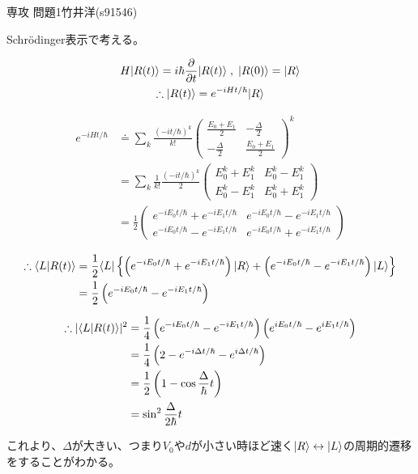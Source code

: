 \documentclass[fleqn]{jbook}
\begin{document}
\begin{answer}{専攻 問題1}{竹井洋(s91546)}
\begin{subanswers}
\SubSubAnswer
Schr\"{o}dinger表示で考える。

\begin{gather*}
H\Ket{R(t)}=i\hbar\frac{\del}{\del t}\Ket{R(t)}\; ,\; \Ket{R(0)}=\Ket{R} \\
\therefore \Ket{R(t)}=e^{-iHt/\hbar}\Ket{R}
\end{gather*}

\begin{align*}
e^{-iHt/\hbar} &\doteq \sum_k\frac{(-it/\hbar)^k}{k!}
\begin{pmatrix}
\frac{E_0+E_1}{2} & -\frac{\Delta}{2} \\
-\frac{\Delta}{2} & \frac{E_0+E_1}{2}
\end{pmatrix}
^k \\
&= \sum_k\frac{1}{k!}\frac{(-it/\hbar)^k}{2}
\begin{pmatrix}
E_0^k+E_1^k & E_0^k-E_1^k \\
E_0^k-E_1^k & E_0^k+E_1^k 
\end{pmatrix}
\\
&= \frac{1}{2}
\begin{pmatrix}
e^{-iE_0t/\hbar}+e^{-iE_1t/\hbar} & e^{-iE_0t/\hbar}-e^{-iE_1t/\hbar} \\
e^{-iE_0t/\hbar}-e^{-iE_1t/\hbar} & e^{-iE_0t/\hbar}+e^{-iE_1t/\hbar}
\end{pmatrix}
\end{align*}

\begin{align*}
\therefore \Product{L}{R(t)} &= \frac{1}{2}\Bra{L}\left\{ \left(e^{-iE_0t/\hbar}+e^{-iE_1t/\hbar}\right)\Ket{R}+\left(e^{-iE_0t/\hbar}-e^{-iE_1t/\hbar}\right)\Ket{L}\right\} \\
&= \frac{1}{2}\left(e^{-iE_0t/\hbar}-e^{-iE_1t/\hbar}\right)
\end{align*}

\begin{align*}
\therefore \Norm{\Product{L}{R(t)}}^2 &= \frac{1}{4}\left(e^{-iE_0 t/\hbar} - e^{-iE_1 t/\hbar}\right)
\left(e^{iE_0 t/\hbar} - e^{iE_1 t/\hbar}\right)\\
&= \frac{1}{4}\left(2-e^{-i\Delta t/\hbar}-e^{i\Delta t/\hbar}\right)\\
&= \frac{1}{2}\left(1-\cos\frac{\Delta}{\hbar}t \right)\\
&=\sin^2\frac{\Delta}{2\hbar}t
\end{align*}

これより、$\Delta$が大きい、つまり$V_0$や$d$が小さい時ほど速く$\Ket{R}\leftrightarrow\Ket{L}$の周期的遷移をすることがわかる。

\end{subanswers}
\end{answer}
\end{document}

